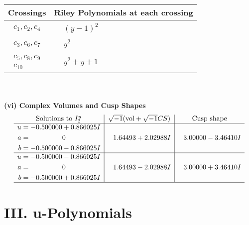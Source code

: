 \documentclass[1p]{elsarticle_modified}
\theoremstyle{definition}
\newcommand{\I}{\sqrt{-1}}
\begin{document}
\begin{tabular}{m{50pt}|m{274pt}}
Crossings & \hspace{64pt}Riley Polynomials at each crossing \\
\hline $$\begin{aligned}c_{1},c_{2},c_{4}\end{aligned}$$&$\begin{aligned}
&(y-1)^2
\end{aligned}$\\
\hline $$\begin{aligned}c_{3},c_{6},c_{7}\end{aligned}$$&$\begin{aligned}
&y^2
\end{aligned}$\\
\hline $$\begin{aligned}c_{5},c_{8},c_{9}\\c_{10}\end{aligned}$$&$\begin{aligned}
&y^2+y+1
\end{aligned}$\\
\hline
\end{tabular}\\~\\
\newpage\flushleft \textbf{(vi) Complex Volumes and Cusp Shapes}
$$\begin{array}{c|c|c}  
\text{Solutions to }I^u_{2}& \I (\text{vol} + \sqrt{-1}CS) & \text{Cusp shape}\\
 \hline 
\begin{aligned}
u &= -0.500000 + 0.866025 I \\
a &= \phantom{-0.000000 } 0 \\
b &= -0.500000 - 0.866025 I\end{aligned}
 & \phantom{-}1.64493 + 2.02988 I & \phantom{-}3.00000 - 3.46410 I \\ \hline\begin{aligned}
u &= -0.500000 - 0.866025 I \\
a &= \phantom{-0.000000 } 0 \\
b &= -0.500000 + 0.866025 I\end{aligned}
 & \phantom{-}1.64493 - 2.02988 I & \phantom{-}3.00000 + 3.46410 I\\
 \hline 
 \end{array}$$\newpage
\newpage\renewcommand{\arraystretch}{1}
\centering \section*{ III. u-Polynomials}
\end{document}
